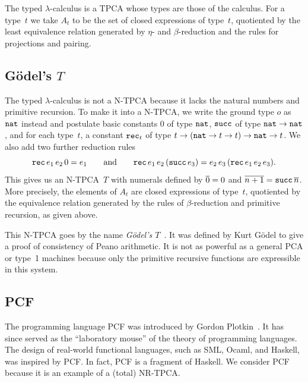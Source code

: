 The typed $\lambda$-calculus is a TPCA whose types are those of the
calculus. For a type~$t$ we take $A_t$ to be the set of closed
expressions of type~$t$, quotiented by the least equivalence relation
generated by $\eta$- and $\beta$-reduction and the rules for
projections and pairing.


\subsection{G\"odel's $T$}

The typed $\lambda$-calculus is not a N-TPCA because it lacks the
natural numbers and primitive recursion. To make it into a N-TPCA, we
write the ground type $o$ as $\mathtt{nat}$ instead and postulate basic
constants $0$ of type $\mathtt{nat}$, $\mathtt{succ}$ of type $\mathtt{nat} \to
\mathtt{nat}$, and for each type~$t$, a constant $\mathtt{rec}_t$ of type $t
\to (\mathtt{nat} \to t \to t) \to \mathtt{nat} \to t$. We also add two
further reduction rules
%
\begin{equation*}
  \mathtt{rec} \, e_1 \, e_2 \, 0 = e_1
  \qquad\text{and}\qquad
  \mathtt{rec} \, e_1 \, e_2 \, (\mathtt{succ} \, e_3) =
  e_2 \, e_3 \, (\mathtt{rec} \, e_1 \, e_2 \, e_3).
\end{equation*}
%
This gives us an N-TPCA~$T$ with numerals defined by $\overline{0} = 0$
and $\overline{n+1} = \mathtt{succ} \, \overline{n}$. More precisely, the
elements of $A_t$ are closed expressions of type~$t$, quotiented by
the equivalence relation generated by the rules of $\beta$-reduction
and primitive recursion, as given above.

This N-TPCA goes by the name \emph{G\"odel's
  $T$}~\cite{GoedelK:ubeefs}. It was defined by Kurt G\"odel to give a
proof of consistency of Peano arithmetic. It is not as powerful as a
general PCA or type~1 machines because only the primitive recursive
functions are expressible in this system.

\subsection{PCF}

The programming language PCF was introduced by Gordon
Plotkin~\cite{plotkin77:_lcf_consid_as_progr_languag}. It has since
served as the ``laboratory mouse'' of the theory of programming
languages. The design of real-world functional languages, such as SML,
Ocaml, and Haskell, was inspired by PCF. In fact, PCF is a fragment of
Haskell. We consider PCF because it is an example of a (total)
NR-TPCA.

